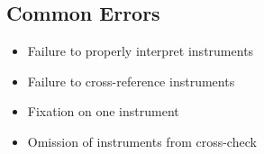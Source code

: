 \subsection{Common Errors}

\begin{itemize}
  \item Failure to properly interpret instruments
  \item Failure to cross-reference instruments
  \item Fixation on one instrument
  \item Omission of instruments from cross-check
\end{itemize}
